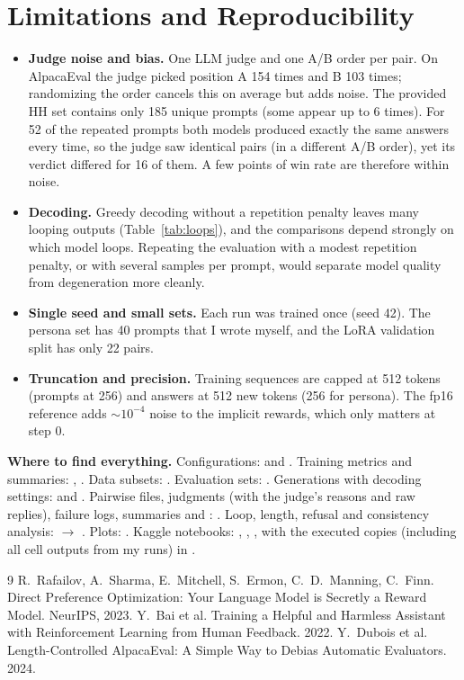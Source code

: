 \documentclass[10pt]{article}
\begin{document}
\section{Limitations and Reproducibility}

\begin{itemize}
  \item \textbf{Judge noise and bias.} One LLM judge and one A/B order per pair. On AlpacaEval the judge picked position A 154 times and B 103 times; randomizing the order cancels this on average but adds noise. The provided HH set contains only 185 unique prompts (some appear up to 6 times). For 52 of the repeated prompts both models produced exactly the same answers every time, so the judge saw identical pairs (in a different A/B order), yet its verdict differed for 16 of them. A few points of win rate are therefore within noise.
  \item \textbf{Decoding.} Greedy decoding without a repetition penalty leaves many looping outputs (Table~\ref{tab:loops}), and the comparisons depend strongly on which model loops. Repeating the evaluation with a modest repetition penalty, or with several samples per prompt, would separate model quality from degeneration more cleanly.
  \item \textbf{Single seed and small sets.} Each run was trained once (seed 42). The persona set has 40 prompts that I wrote myself, and the LoRA validation split has only 22 pairs.
  \item \textbf{Truncation and precision.} Training sequences are capped at 512 tokens (prompts at 256) and answers at 512 new tokens (256 for persona). The fp16 reference adds $\sim\!10^{-4}$ noise to the implicit rewards, which only matters at step 0.
\end{itemize}

\textbf{Where to find everything.} Configurations:  and . Training metrics and summaries: , . Data subsets: . Evaluation sets: . Generations with decoding settings:  and . Pairwise files, judgments (with the judge's reasons and raw replies), failure logs, summaries and : . Loop, length, refusal and consistency analysis:  $\to$ . Plots: . Kaggle notebooks: , , , with the executed copies (including all cell outputs from my runs) in .

\begin{thebibliography}{9}\small
{} R.~Rafailov, A.~Sharma, E.~Mitchell, S.~Ermon, C.~D.~Manning, C.~Finn. Direct Preference Optimization: Your Language Model is Secretly a Reward Model. NeurIPS, 2023.
 Y.~Bai et al. Training a Helpful and Harmless Assistant with Reinforcement Learning from Human Feedback. 2022.
 Y.~Dubois et al. Length-Controlled AlpacaEval: A Simple Way to Debias Automatic Evaluators. 2024.
\end{thebibliography}
\end{document}
